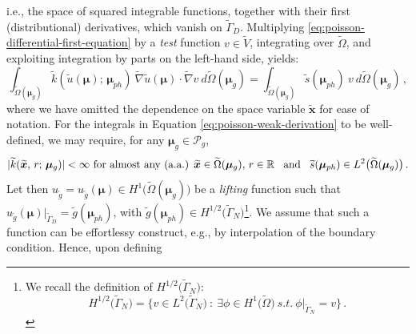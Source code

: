 \documentclass[12pt, a4paper, twoside, openright]{report}
\numberwithin{equation}{chapter}
\theoremstyle{theorem}
\theoremstyle{definition}
\theoremstyle{remark}
\theoremstyle{proposition}
\numberwithin{figure}{chapter}
\newcommand{\wt}[1]{\widetilde{#1}}
\newcommand{\bg}[1]{\boldsymbol{#1}}
\begin{document}
		i.e., the space of squared integrable functions, together with their first (distributional) derivatives, which vanish on $\wt{\Gamma}_D$. Multiplying \eqref{eq:poisson-differential-first-equation} by a \emph{test} function $v \in \wt{V}$, integrating over $\wt{\Omega}$, and exploiting integration by parts on the left-hand side, yields:
		\begin{equation}
			\label{eq:poisson-weak-derivation}
			\int_{\wt{\Omega}(\bg{\mu}_g)} \wt{k}(\wt{u}(\bg{\mu}); \, \bg{\mu}_{ph}) ~ \wt{\nabla} \wt{u}(\bg{\mu}) \cdot \wt{\nabla} v ~ d\wt{\Omega}(\bg{\mu}_g) = \int_{\wt{\Omega}(\bg{\mu}_g)} \wt{s}(\bg{\mu}_{ph}) ~ v ~ d\wt{\Omega}(\bg{\mu}_g) \, ,
		\end{equation}
		where we have omitted the dependence on the space variable $\wt{\bg{x}}$ for ease of notation. For the integrals in Equation \eqref{eq:poisson-weak-derivation} to be well-defined, we may require, for any $\bg{\mu}_g \in \mathcal{P}_g$, 
		\begin{equation*}
			\text{$|\wt{k}(\wt{\bg{x}}, \, r; \, \bg{\mu}_g)| < \infty$ for almost any (a.a.) $\wt{\bg{x}} \in \wt{\Omega}(\bg{\mu}_g), \, r \in \mathbb{R}$}  \hspace*{0.3cm} \text{and} \hspace*{0.3cm} \wt{s}(\bg{\mu}_{ph}) \in L^2 \big( \wt{\Omega}(\bg{\mu}_g) \big) \, .
		\end{equation*}
		Let then $u_{\wt{g}} = u_{\wt{g}}(\bg{\mu}) \in H^1 \big( \wt{\Omega}(\bg{\mu}_g) \big)$ be a \emph{lifting} function such that $u_{\wt{g}}(\bg{\mu}) \big\rvert_{\wt{\Gamma}_D} = \wt{g}(\bg{\mu}_{ph})$, with $\wt{g}(\bg{\mu}_{ph}) \in H^{1/2} \big( \wt{\Gamma}_N \big)$\footnote{We recall the definition of $H^{1/2} \big( \wt{\Gamma}_N \big)$: \begin{equation*} H^{1/2} \big( \wt{\Gamma}_N \big) = \big\lbrace v \in L^2 \big( \wt{\Gamma}_N \big) ~ : ~ \exists \phi \in H^1 \big(\wt{\Omega} \big) ~ s.t. ~ \phi \big\rvert_{\wt{\Gamma}_N} = v \big\rbrace \, . \end{equation*}}. We assume that such a function can be effortlessy construct, e.g., by interpolation of the boundary condition. Hence, upon defining
\end{document}
